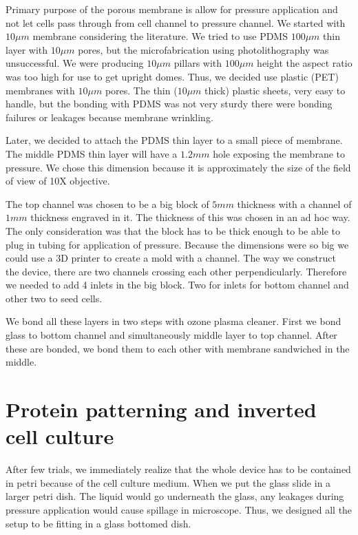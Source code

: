 Primary purpose of the porous membrane is allow for pressure application
and not let cells pass through from cell channel to pressure channel. We
started with \(10\mu m\) membrane considering the literature. We tried
to use PDMS \(100 \mu m\) thin layer with \(10\mu m\) pores, but the
microfabrication using photolithography was unsuccessful. We were
producing \(10\mu m\) pillars with \(100 \mu m\) height the aspect ratio
was too high for use to get upright domes. Thus, we decided use plastic
(PET) membranes with \(10\mu m\) pores. The thin (\(10\mu m\) thick)
plastic sheets, very easy to handle, but the bonding with PDMS was not
very sturdy there were bonding failures or leakages because membrane
wrinkling.

Later, we decided to attach the PDMS thin layer to a small piece of
membrane. The middle PDMS thin layer will have a \(1.2 mm\) hole
exposing the membrane to pressure. We chose this dimension because it is
approximately the size of the field of view of 10X objective.

The top channel was chosen to be a big block of \(5mm\) thickness with a
channel of \(1mm\) thickness engraved in it. The thickness of this was
chosen in an ad hoc way. The only consideration was that the block has
to be thick enough to be able to plug in tubing for application of
pressure. Because the dimensions were so big we could use a 3D printer
to create a mold with a channel. The way we construct the device, there
are two channels crossing each other perpendicularly. Therefore we
needed to add 4 inlets in the big block. Two for inlets for bottom
channel and other two to seed cells.

We bond all these layers in two steps with ozone plasma cleaner. First
we bond glass to bottom channel and simultaneously middle layer to top
channel. After these are bonded, we bond them to each other with
membrane sandwiched in the middle.

\hypertarget{protein-patterning-and-inverted-cell-culture}{%
\section{Protein patterning and inverted cell
culture}\label{protein-patterning-and-inverted-cell-culture}}

After few trials, we immediately realize that the whole device has to be
contained in petri because of the cell culture medium. When we put the
glass slide in a larger petri dish. The liquid would go underneath the
glass, any leakages during pressure application would cause spillage in
microscope. Thus, we designed all the setup to be fitting in a glass
bottomed dish.


